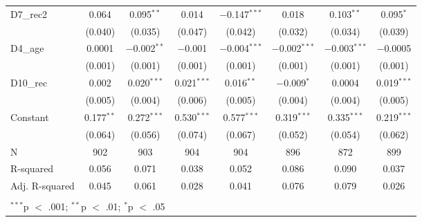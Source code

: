 \documentclass[
]{article}
\begin{document}
\begin{table}[!htbp]
\begin{tabular}{@{\extracolsep{5pt}}lccccccc}
  D7\_rec2 & 0.064 & 0.095$^{**}$ & 0.014 & $-$0.147$^{***}$ & 0.018 & 0.103$^{**}$ & 0.095$^{*}$ \\ 
  & (0.040) & (0.035) & (0.047) & (0.042) & (0.032) & (0.034) & (0.039) \\ 
  D4\_age & 0.0001 & $-$0.002$^{**}$ & $-$0.001 & $-$0.004$^{***}$ & $-$0.002$^{***}$ & $-$0.003$^{***}$ & $-$0.0005 \\ 
  & (0.001) & (0.001) & (0.001) & (0.001) & (0.001) & (0.001) & (0.001) \\ 
  D10\_rec & 0.002 & 0.020$^{***}$ & 0.021$^{***}$ & 0.016$^{**}$ & $-$0.009$^{*}$ & 0.0004 & 0.019$^{***}$ \\ 
  & (0.005) & (0.004) & (0.006) & (0.005) & (0.004) & (0.004) & (0.005) \\ 
  Constant & 0.177$^{**}$ & 0.272$^{***}$ & 0.530$^{***}$ & 0.577$^{***}$ & 0.319$^{***}$ & 0.335$^{***}$ & 0.219$^{***}$ \\ 
  & (0.064) & (0.056) & (0.074) & (0.067) & (0.052) & (0.054) & (0.062) \\ 
 N & 902 & 903 & 904 & 904 & 896 & 872 & 899 \\ 
R-squared & 0.056 & 0.071 & 0.038 & 0.052 & 0.086 & 0.090 & 0.037 \\ 
Adj. R-squared & 0.045 & 0.061 & 0.028 & 0.041 & 0.076 & 0.079 & 0.026 \\ 
\hline \\[-1.8ex] 
\multicolumn{8}{l}{$^{***}$p $<$ .001; $^{**}$p $<$ .01; $^{*}$p $<$ .05} \\ 
\end{tabular} 
\end{table}
\end{document}

